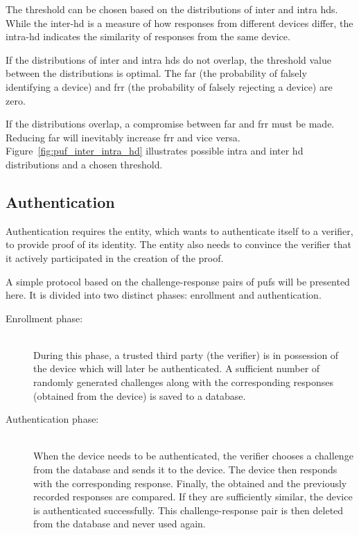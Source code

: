 The threshold can be chosen based on the distributions of inter and intra \glspl{hd}. While the inter-\gls{hd} is a measure of how responses from different devices differ, the intra-\gls{hd} indicates the similarity of responses from the same device.

If the distributions of inter and intra \glspl{hd} do not overlap, the threshold value between the distributions is optimal. The \gls{far} (the probability of falsely identifying a device) and \gls{frr} (the probability of falsely rejecting a device) are zero.

If the distributions overlap, a compromise between \gls{far} and \gls{frr} must be made. Reducing \gls{far} will inevitably increase \gls{frr} and vice versa. Figure~\ref{fig:puf_inter_intra_hd} illustrates possible intra and inter \gls{hd} distributions and a chosen threshold.

\subsection{Authentication}

Authentication requires the entity, which wants to authenticate itself to a verifier, to provide proof of its identity. The entity also needs to convince the verifier that it actively participated in the creation of the proof.\cite{Maes2012}

A simple protocol based on the challenge-response pairs of \glspl{puf} will be presented here. It is divided into two distinct phases: enrollment and authentication.\cite{Devadas2008}

\begin{description}
    \item[Enrollment phase:] \hfill \\ During this phase, a trusted third party (the verifier) is in possession of the device which will later be authenticated. A sufficient number of randomly generated challenges along with the corresponding responses (obtained from the device) is saved to a database.
    \item[Authentication phase:] \hfill \\ When the device needs to be authenticated, the verifier chooses a challenge from the database and sends it to the device. The device then responds with the corresponding response. Finally, the obtained and the previously recorded responses are compared. If they are sufficiently similar, the device is authenticated successfully. This challenge-response pair is then deleted from the database and never used again.
\end{description}


